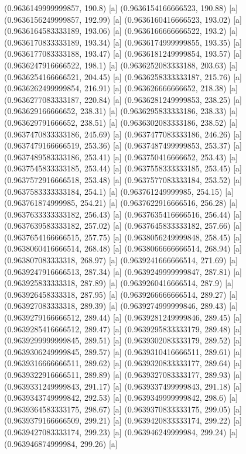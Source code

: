 {{{(0.9636149999999857, 190.8) [a] 
(0.9636154166666523, 190.88) [a] 
(0.9636156249999857, 192.99) [a] 
(0.9636160416666523, 193.02) [a] 
(0.9636164583333189, 193.06) [a] 
(0.9636166666666522, 193.2) [a] 
(0.9636170833333189, 193.34) [a] 
(0.9636174999999855, 193.35) [a] 
(0.9636177083333188, 193.47) [a] 
(0.9636181249999854, 193.57) [a] 
(0.9636247916666522, 198.1) [a] 
(0.9636252083333188, 203.63) [a] 
(0.9636254166666521, 204.45) [a] 
(0.9636258333333187, 215.76) [a] 
(0.9636262499999854, 216.91) [a] 
(0.963626666666652, 218.38) [a] 
(0.9636277083333187, 220.84) [a] 
(0.9636281249999853, 238.25) [a] 
(0.963629166666652, 238.31) [a] 
(0.9636295833333186, 238.33) [a] 
(0.963629791666652, 238.51) [a] 
(0.9636302083333186, 238.52) [a] 
(0.9637470833333186, 245.69) [a] 
(0.9637477083333186, 246.26) [a] 
(0.9637479166666519, 253.36) [a] 
(0.9637487499999853, 253.37) [a] 
(0.9637489583333186, 253.41) [a] 
(0.963750416666652, 253.43) [a] 
(0.9637545833333185, 253.44) [a] 
(0.9637558333333185, 253.45) [a] 
(0.9637572916666518, 253.48) [a] 
(0.9637577083333184, 253.52) [a] 
(0.9637583333333184, 254.1) [a] 
(0.963761249999985, 254.15) [a] 
(0.963761874999985, 254.21) [a] 
(0.9637622916666516, 256.28) [a] 
(0.9637633333333182, 256.43) [a] 
(0.9637635416666516, 256.44) [a] 
(0.9637639583333182, 257.02) [a] 
(0.9637645833333182, 257.66) [a] 
(0.9637654166666515, 257.75) [a] 
(0.9638056249999848, 258.45) [a] 
(0.9638060416666514, 268.48) [a] 
(0.9638066666666514, 268.94) [a] 
(0.963807083333318, 268.97) [a] 
(0.9639241666666514, 271.69) [a] 
(0.9639247916666513, 287.34) [a] 
(0.9639249999999847, 287.81) [a] 
(0.963925833333318, 287.89) [a] 
(0.9639260416666514, 287.9) [a] 
(0.963926458333318, 287.95) [a] 
(0.9639266666666514, 289.27) [a] 
(0.963927083333318, 289.39) [a] 
(0.9639274999999846, 289.43) [a] 
(0.9639279166666512, 289.44) [a] 
(0.9639281249999846, 289.45) [a] 
(0.9639285416666512, 289.47) [a] 
(0.9639295833333179, 289.48) [a] 
(0.9639299999999845, 289.51) [a] 
(0.9639302083333179, 289.52) [a] 
(0.9639306249999845, 289.57) [a] 
(0.9639310416666511, 289.61) [a] 
(0.9639316666666511, 289.62) [a] 
(0.9639320833333177, 289.64) [a] 
(0.9639322916666511, 289.89) [a] 
(0.9639327083333177, 289.93) [a] 
(0.9639331249999843, 291.17) [a] 
(0.9639337499999843, 291.18) [a] 
(0.9639343749999842, 292.53) [a] 
(0.9639349999999842, 298.6) [a] 
(0.9639364583333175, 298.67) [a] 
(0.9639370833333175, 299.05) [a] 
(0.9639379166666509, 299.21) [a] 
(0.9639420833333174, 299.22) [a] 
(0.9639427083333174, 299.23) [a] 
(0.963946249999984, 299.24) [a] 
(0.963946874999984, 299.26) [a] 
}}}
